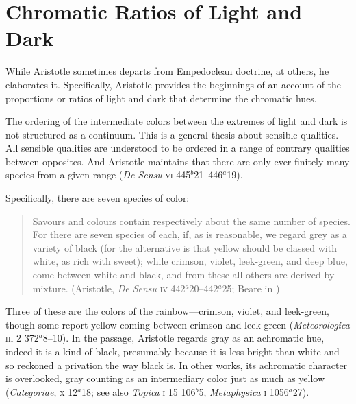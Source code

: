 

\section{Chromatic Ratios of Light and Dark} %
\label{sec:chromatic_ratios_of_light_and_dark}

While Aristotle sometimes departs from Empedoclean doctrine, at others, he elaborates it. Specifically, Aristotle provides the beginnings of an account of the proportions or ratios of light and dark that determine the chromatic hues.

The ordering of the intermediate colors between the extremes of light and dark is not structured as a continuum. This is a general thesis about sensible qualities. All sensible qualities are understood to be ordered in a range of contrary qualities between opposites. And Aristotle maintains that there are only ever finitely many species from a given range (\emph{De Sensu} \textsc{vi} 445\( ^{b} \)21--446\( ^{a} \)19).

Specifically, there are seven species of color:
\begin{quote}
	Savours and colours contain respectively about the same number of species. For there are seven species of each, if, as is reasonable, we regard grey as a variety of black (for the alternative is that yellow should be classed with white, as rich with sweet); while crimson, violet, leek-green, and deep blue, come between white and black, and from these all others are derived by mixture. (Aristotle, \emph{De Sensu} \textsc{iv} 442\( ^{a} \)20--442\( ^{a} \)25; Beare in \citealt[12]{Barnes:1984uq})
\end{quote}
Three of these are the colors of the rainbow---crimson, violet, and leek-green, though some report yellow coming between crimson and leek-green (\emph{Meteorologica} \textsc{iii} 2 372\( ^{a} \)8--10). In the passage, Aristotle regards gray as an achromatic hue, indeed it is a kind of black, presumably because it is less bright than white and so reckoned a privation the way black is. In other works, its achromatic character is overlooked, gray counting as an intermediary color just as much as yellow (\emph{Categoriae}, \textsc{x} 12\( ^{a} \)18; see also \emph{Topica} \textsc{i} 15 106\( ^{b} \)5, \emph{Metaphysica} \textsc{i} 1056\( ^{a} \)27).

